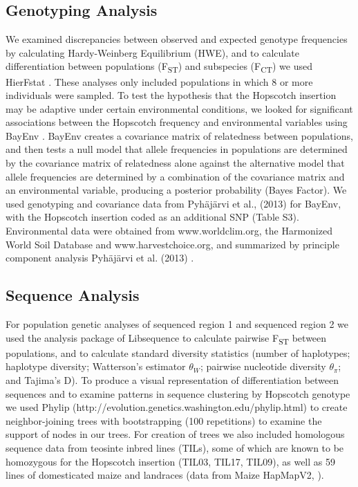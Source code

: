 \documentclass[12pt]{article}
\begin{document}
\subsection*{Genotyping Analysis}

We examined discrepancies between observed and expected genotype frequencies by calculating Hardy-Weinberg Equilibrium (HWE), and to calculate differentiation between populations (F\textsubscript{ST}) and subspecies (F\textsubscript{CT}) we used HierFstat \cite{Goudet 2005}. These analyses only included populations in which 8 or more individuals were sampled. To test the hypothesis that the Hopscotch insertion may be adaptive under certain environmental conditions, we looked for significant associations between the Hopscotch frequency and environmental variables using BayEnv \cite{Coop et al 2010}. BayEnv creates a covariance matrix of relatedness between populations, and then tests a null model that allele frequencies in populations are determined by the covariance matrix of relatedness alone against the alternative model that allele frequencies are determined by a combination of the covariance matrix and an environmental variable, producing a posterior probability (Bayes Factor)\cite{Coop et al 2010}. We used genotyping and covariance data from Pyhäjärvi et al., (2013) \cite{Pyhajarvi et al 2013} for BayEnv, with the Hopscotch insertion coded as an additional SNP (Table S3). Environmental data were obtained from www.worldclim.org, the Harmonized World Soil Database and www.harvestchoice.org, and summarized by principle component analysis Pyhäjärvi et al. (2013) \cite{Pyhajarvi et al 2013}.

\subsection*{Sequence Analysis}

For population genetic analyses of sequenced region 1 and sequenced region 2 we used the analysis package of Libsequence \cite{Thornton 2003} to calculate pairwise F\textsubscript{ST} between populations, and to calculate standard diversity statistics (number of haplotypes; haplotype diversity; Watterson's estimator $\theta_{W}$; pairwise nucleotide diversity $\theta_{\pi}$; and Tajima's D). To produce a visual representation of differentiation between sequences and to examine patterns in sequence clustering by Hopscotch genotype we used Phylip (http://evolution.genetics.washington.edu/phylip.html) to create neighbor-joining trees with bootstrapping (100 repetitions) to examine the support of nodes in our trees. For creation of trees we also included homologous sequence data from teosinte inbred lines (TILs), some of which are known to be homozygous for the Hopscotch insertion (TIL03, TIL17, TIL09), as well as 59 lines of domesticated maize and landraces (data from Maize HapMapV2, \cite{Chia et al 2012}).
\end{document}
